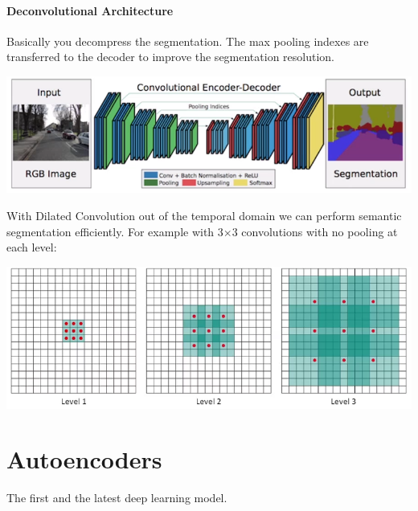 \documentclass[10pt]{report}
\begin{document}
\paragraph{Deconvolutional Architecture} Basically you decompress the segmentation. The max pooling indexes are transferred to the decoder to improve the segmentation resolution.
\begin{center}
	\includegraphics[scale=0.5]{73.png}
\end{center}
With Dilated Convolution out of the temporal domain we can perform semantic segmentation efficiently. For example with 3$\times$3 convolutions with no pooling at each level:
\begin{center}
	\includegraphics[scale=0.5]{74.png}
\end{center}
\section{Autoencoders} The first and the latest deep learning model.
\end{document}
